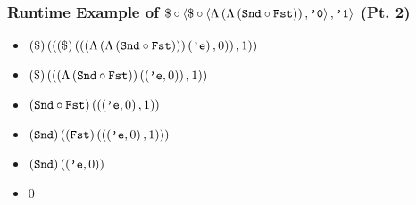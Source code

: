 \documentclass[aspectratio=169, draft]{beamer}
\begin{document}
\begin{frame}
	\frametitle{Runtime Example of $\mathtt{\$}\circ\left<\mathtt{\$}\circ\left< \Lambda\left(\Lambda\left(\mathtt{Snd}\circ\mathtt{Fst}\right)\right), \texttt{'0}\right>, \texttt{'1}\right>$ (Pt. 2)}
	\begin{itemize}[<+->]
		\item $\left(\mathtt{\$}\right)\left(\left(
			\left(\mathtt{\$}\right)\left(\left(
				\left(\Lambda\left(\Lambda\left(\mathtt{Snd}\circ\mathtt{Fst}\right)\right)\right)\left(\texttt{'e}\right)
			, 0\right)\right)
		, 1\right)\right)$
		\item $\left(\mathtt{\$}\right)\left(\left(
			\left(
				\Lambda\left(\mathtt{Snd}\circ\mathtt{Fst}\right)
			\right)\left(
				\left(\texttt{'e}, 0\right)
			\right)
		, 1\right)\right)$
		\item $\left(\mathtt{Snd}\circ\mathtt{Fst}\right)\left(\left(
			\left(\texttt{'e}, 0\right)
		, 
			1
		\right)\right)$
		\item $\left(\mathtt{Snd}\right)\left(\left(\mathtt{Fst}\right)\left(\left(
			\left(\texttt{'e}, 0\right)
		, 
			1
		\right)\right)\right)$
		\item $\left(\mathtt{Snd}\right)\left(\left(\texttt{'e}, 0\right)\right)$
		\item $0$
	\end{itemize}
\end{frame}
\end{document}
